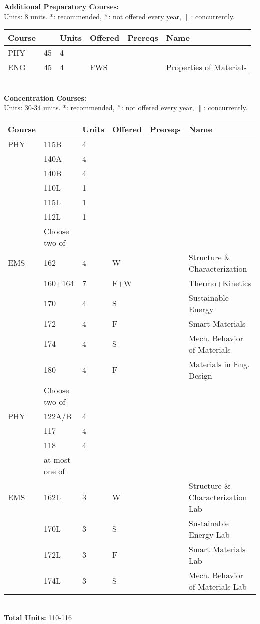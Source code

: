 \documentclass[12pt]{article}
\begin{document}
\newpage
{}
\vskip 0.25cm
\noindent
{\bf Additional Preparatory Courses:  }\\
Units:  8 units. *: recommended, $^\#$: not offered every year, $\parallel$: concurrently.\\
\begin{tabular}{|llllll|}
\hline
Course & & Units & Offered & Prereqs & Name \\
\hline
PHY & 45     & 4 & & & \\
ENG & 45     & 4 & FWS & & Properties of Materials \\
\hline
\end{tabular}\\
\vskip 0.25cm
\noindent
{\bf Concentration Courses:  }\\
Units:  30-34 units. *: recommended, $^\#$: not offered every year, $\parallel$: concurrently.\\
\begin{tabular}{|llllll|}
\hline
Course & & Units & Offered & Prereqs & Name \\
\hline
PHY & 115B   & 4 & & & \\
    & 140A   & 4 & & & \\
    & 140B   & 4 & & & \\
    & 110L & 1 & & & \\
    & 115L & 1 & & & \\
    & 112L & 1 & & & \\
\hline
\hline
    & Choose two of & & & & \\
\hline
EMS & 162     & 4 & W & & Structure \& Characterization \\
    & 160+164 & 7 & F+W & & Thermo+Kinetics \\
    & 170     & 4 & S & & Sustainable Energy \\ 
    & 172     & 4 & F & & Smart Materials \\
    & 174     & 4 & S & & Mech. Behavior of Materials\\
    & 180     & 4 & F & & Materials in Eng. Design\\
\hline
\hline
    & Choose two of & & & & \\
\hline
PHY & 122A/B & 4 & & & \\
    & 117   & 4 & & & \\
    & 118   & 4 & & & \\
    & at most one of & & & & \\
EMS & 162L   & 3 & W & & Structure \& Characterization Lab\\
    & 170L   & 3 & S & & Sustainable Energy Lab \\
    & 172L   & 3 & F & & Smart Materials Lab \\
    & 174L   & 3 & S & & Mech. Behavior of Materials Lab \\
\hline
\end{tabular}\\
\noindent
{\bf Total Units:} 110-116 \\
\end{document}
